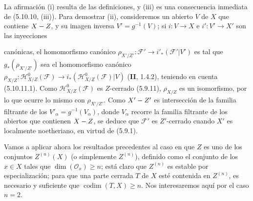 La afirmación (i) resulta de las definiciones, y (iii) es una consecuencia
inmediata de (5.10.10, (iii)). Para demostrar (ii), consideremos un abierto
$V$ de $X$ que contiene $X- Z$, y su imagen inversa $V'=g^{-1}(V)$; si
$i:V\to X$ e $i':V'\to X'$ son las inyecciones


canónicas, el homomorfismo canónico
$\rho_{X'/Z'}:\mathcal F'\to i'_*(\mathcal F'|V')$ es tal que
$g_*(\rho_{X'/Z'})$ sea el homomorfismo canónico
$\rho_{X/Z}:\mathcal H^0_{X/Z}(\mathcal F)
\to i_*(\mathcal H^0_{X/Z}(\mathcal F)|V)$
(\textbf{II}, 1.4.2), teniendo en cuenta (5.10.11.1). Como
$\mathcal H^0_{X/Z}(\mathcal F)$ es $Z$-cerrado (5.9.11), $\rho_{X/Z}$ es un
isomorfismo, por lo que ocurre lo mismo con $\rho_{X'/Z'}$. Como $X'- Z'$ es
intersección de la familia filtrante de los $V'_\alpha=g^{-1}(V_\alpha)$,
donde $V_\alpha$ recorre la familia filtrante de los abiertos que contienen
$X- Z$, se deduce que $\mathcal F'$ es $Z'$-cerrado cuando $X'$ es localmente
noetheriano, en virtud de (5.9.1).

\begin{env}[5.10.13]
\label{IV.2.s5.10.13-fr}
Vamos a aplicar ahora los resultados precedentes al caso en que $Z$ es uno de
los conjuntos $Z^{(n)}(X)$ (o simplemente $Z^{(n)}$), definido como el conjunto
de los $x\in X$ tales que $\dim(\mathcal O_x)\geq n$; está claro que
$Z^{(n)}$ es estable por especialización; para que una parte cerrada $T$ de $X$
esté contenida en $Z^{(n)}$, es necesario y suficiente que
$\operatorname{codim}(T,X)\geq n$. Nos interesaremos aquí por el caso $n=2$.
\end{env}
